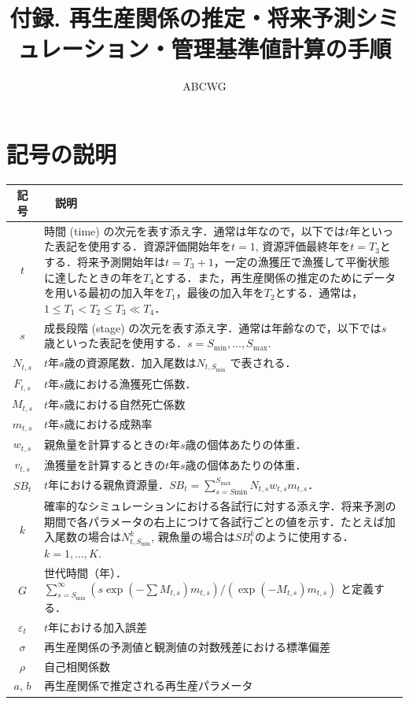 \documentclass[11pt]{jsarticle}
\begin{document}
\title{付録. 再生産関係の推定・将来予測シミュレーション・管理基準値計算の手順}
\author{ABCWG}
\maketitle

\section{記号の説明}
\begin{table}[h]
  \begin{tabular}{cp{14cm}} \hline
    記号    & 　説明 \\ \hline
    $t$ & 時間 (time) の次元を表す添え字．通常は年なので，以下では$t$年といった表記を使用する．資源評価開始年を$t=1$, 資源評価最終年を$t=T_3$とする．将来予測開始年は$t=T_{3}+1$，一定の漁獲圧で漁獲して平衡状態に達したときの年を$T_4$とする．また，再生産関係の推定のためにデータを用いる最初の加入年を$T_1$，最後の加入年を$T_2$とする．通常は，$1 \leq T_1 < T_2 \leq T_3 \ll T_4$．\\
    $s$ & 成長段階 (stage) の次元を表す添え字．通常は年齢なので，以下では$s$歳といった表記を使用する．$s=S_{\mathrm{min}},...,S_{\mathrm{max}}$.\\
    $N_{t,s}$ & $t$年$s$歳の資源尾数．加入尾数は$N_{t,S_{\mathrm{min}}}$ で表される．\\
    $F_{t,s}$ & $t$年$s$歳における漁獲死亡係数．\\
    $M_{t,s}$ & $t$年$s$歳における自然死亡係数\\
    $m_{t,s}$ & $t$年$s$歳における成熟率\\
    $w_{t,s}$ & 親魚量を計算するときの$t$年$s$歳の個体あたりの体重．\\
    $v_{t,s}$ & 漁獲量を計算するときの$t$年$s$歳の個体あたりの体重．\\
    $SB_{t} $ & $t$年における親魚資源量．$SB_t=\sum_{s=S\mathrm{min}}^{S_{\mathrm{max}}}N_{t,s} w_{t,s} m_{t,s}$．\\
    $k$      & 確率的なシミュレーションにおける各試行に対する添え字．将来予測の期間で各パラメータの右上につけて各試行ごとの値を示す．たとえば加入尾数の場合は$N_{t,S_{\mathrm{min}}}^k$, 親魚量の場合は$SB_t^k$のように使用する．$k=1,…,K$.\\
    $G$       & 世代時間（年）．$\sum_{s=S_{\mathrm{min}}}^\infty (s \exp(-\sum M_{t,s}) m_{t, s})/(\exp(-M_{t,s}) m_{t,s})$ と定義する．\\
    $\varepsilon_t$  & $t$年における加入誤差\\
    $\sigma$  & 再生産関係の予測値と観測値の対数残差における標準偏差\\
    $\rho$  & 自己相関係数\\    
    $a$, $b$  & 再生産関係で推定される再生産パラメータ\\ \hline
  \end{tabular}
\end{table}
\end{document}
